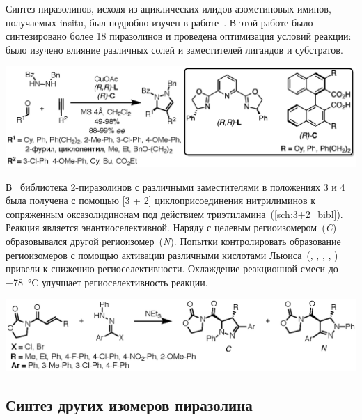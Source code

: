 Синтез пиразолинов, исходя из ациклических илидов азометиновых иминов, получаемых \ac{insitu}, был подробно изучен в работе~\cite{Hashimoto2013}.
В этой работе было синтезировано более \num{18} пиразолинов и проведена оптимизация условий реакции: было изучено влияние различных солей  и заместителей лигандов и субстратов.

\begin{scheme}
    \centering
    \includegraphics{sections/literature/img/cycloaddition_example.eps}
    \caption{}
    \label{sch:cycloaddition_example}
\end{scheme}

В~\cite{Manyem2007} библиотека 2-пиразолинов с различными заместителями в положениях 3 и 4 была получена с помощью [3 + 2] циклоприсоединения нитрилиминов к сопряженным оксазолидинонам под действием триэтиламина~(\ref{sch:3+2_bibl}).
Реакция является энантиоселективной. Наряду с целевым региоизомером~(\emph{C}) образовывался другой региоизомер~(\emph{N}).
Попытки контролировать образование региоизомеров с помощью активации различными кислотами Льюиса~(, , , , ) привели к снижению региоселективности.
Охлаждение реакционной смеси до \SI{-78}{\celsius} улучшает региоселективность реакции.

\begin{scheme}
    \centering
    \includegraphics{sections/literature/img/3+2_bibl.eps}
    \caption{}
    \label{sch:3+2_bibl}
\end{scheme}
\FloatBarrier

\subsection{Синтез других изомеров пиразолина}

